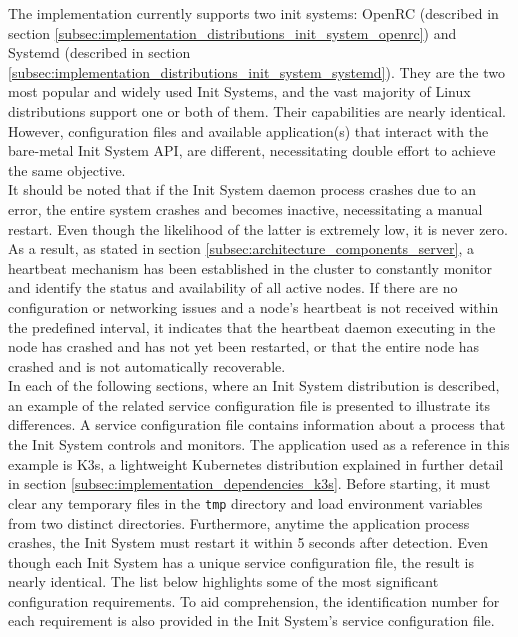 The implementation currently supports two init systems: OpenRC (described in section
\ref{subsec:implementation_distributions_init_system_openrc}) and Systemd (described
in section \ref{subsec:implementation_distributions_init_system_systemd}). They are
the two most popular and widely used Init Systems, and the vast majority of
Linux distributions support one or both of them. Their capabilities are nearly identical.
However, configuration files and available application(s) that interact with the
bare-metal Init System API, are different, necessitating double effort to
achieve the same objective. \\ %
It should be noted that if the Init System daemon process crashes due to an
error, the entire system crashes and becomes inactive, necessitating a manual
restart. Even though the likelihood of the latter is extremely low, it is never
zero. As a result, as stated in section
\ref{subsec:architecture_components_server}, a heartbeat mechanism has been established
in the cluster to constantly monitor and identify the status and availability of
all active nodes. If there are no configuration or networking issues and a node's
heartbeat is not received within the predefined interval, it indicates that the heartbeat
daemon executing in the node has crashed and has not yet been restarted, or that
the entire node has crashed and is not automatically recoverable. \\ %
In each of the following sections, where an Init System distribution is described,
an example of the related service configuration file is presented to illustrate
its differences. A service configuration file contains information about a process
that the Init System controls and monitors. The application used as a reference
in this example is K3s, a lightweight Kubernetes distribution explained in further
detail in section \ref{subsec:implementation_dependencies_k3s}. Before starting,
it must clear any temporary files in the \texttt{tmp} directory and load
environment variables from two distinct directories. Furthermore, anytime the
application process crashes, the Init System must restart it within 5 seconds after
detection. Even though each Init System has a unique service configuration file,
the result is nearly identical. The list below highlights some of the most
significant configuration requirements. To aid comprehension, the identification
number for each requirement is also provided in the Init System's service
configuration file.
